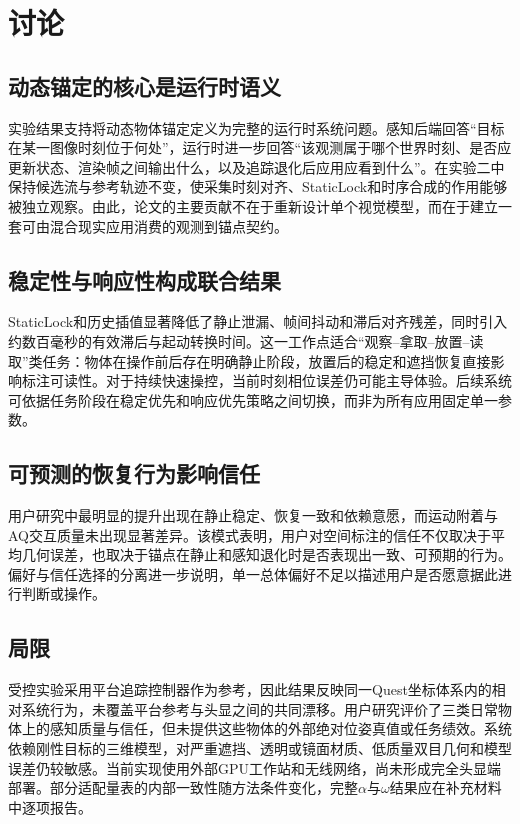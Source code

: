\documentclass[review]{vgtc}
\begin{document}
\section{讨论}

\subsection{动态锚定的核心是运行时语义}
实验结果支持将动态物体锚定定义为完整的运行时系统问题。感知后端回答“目标在某一图像时刻位于何处”，运行时进一步回答“该观测属于哪个世界时刻、是否应更新状态、渲染帧之间输出什么，以及追踪退化后应用应看到什么”。在实验二中保持候选流与参考轨迹不变，使采集时刻对齐、StaticLock和时序合成的作用能够被独立观察。由此，论文的主要贡献不在于重新设计单个视觉模型，而在于建立一套可由混合现实应用消费的观测到锚点契约。

\subsection{稳定性与响应性构成联合结果}
StaticLock和历史插值显著降低了静止泄漏、帧间抖动和滞后对齐残差，同时引入约数百毫秒的有效滞后与起动转换时间。这一工作点适合“观察--拿取--放置--读取”类任务：物体在操作前后存在明确静止阶段，放置后的稳定和遮挡恢复直接影响标注可读性。对于持续快速操控，当前时刻相位误差仍可能主导体验。后续系统可依据任务阶段在稳定优先和响应优先策略之间切换，而非为所有应用固定单一参数。

\subsection{可预测的恢复行为影响信任}
用户研究中最明显的提升出现在静止稳定、恢复一致和依赖意愿，而运动附着与AQ交互质量未出现显著差异。该模式表明，用户对空间标注的信任不仅取决于平均几何误差，也取决于锚点在静止和感知退化时是否表现出一致、可预期的行为。偏好与信任选择的分离进一步说明，单一总体偏好不足以描述用户是否愿意据此进行判断或操作。

\subsection{局限}
受控实验采用平台追踪控制器作为参考，因此结果反映同一Quest坐标体系内的相对系统行为，未覆盖平台参考与头显之间的共同漂移。用户研究评价了三类日常物体上的感知质量与信任，但未提供这些物体的外部绝对位姿真值或任务绩效。系统依赖刚性目标的三维模型，对严重遮挡、透明或镜面材质、低质量双目几何和模型误差仍较敏感。当前实现使用外部GPU工作站和无线网络，尚未形成完全头显端部署。部分适配量表的内部一致性随方法条件变化，完整$\alpha$与$\omega$结果应在补充材料中逐项报告。
\end{document}
